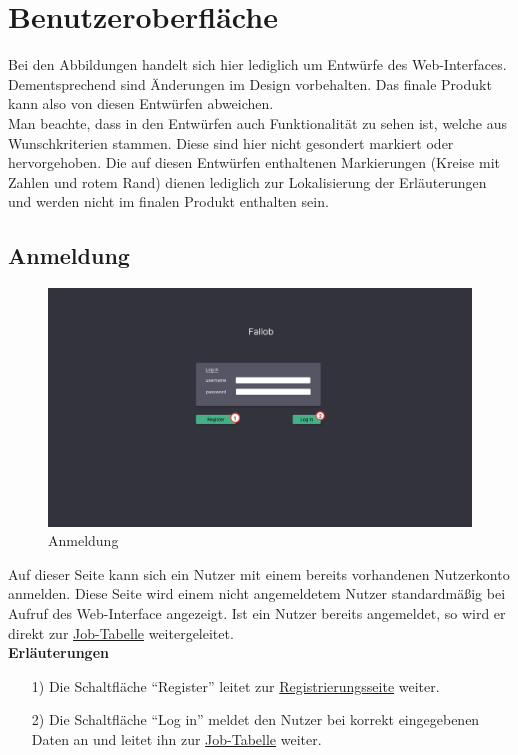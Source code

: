 \section{Benutzeroberfläche}

Bei den Abbildungen handelt sich hier lediglich um Entwürfe des \gls{Web-Interface}s. Dementsprechend sind Änderungen im Design vorbehalten. Das finale Produkt kann also von diesen Entwürfen abweichen.\\
Man beachte, dass in den Entwürfen auch Funktionalität zu sehen ist, welche aus Wunschkriterien stammen. Diese sind hier nicht gesondert markiert oder hervorgehoben. Die auf diesen Entwürfen enthaltenen Markierungen (Kreise mit Zahlen und rotem Rand) dienen lediglich zur Lokalisierung der Erläuterungen und werden nicht im finalen Produkt enthalten sein.
\subsection{Anmeldung}
\label{pages:login}
\begin{figure}[H]
    \centering
    \includegraphics[width=\textwidth]{images-interface/v4_interface/login_page_4.pdf}
    \caption{Anmeldung}
    \label{fig:login}
\end{figure}
Auf dieser Seite kann sich ein \gls{Nutzer} mit einem bereits vorhandenen \gls{Nutzerkonto} anmelden. Diese Seite wird einem nicht angemeldetem \gls{Nutzer} standardmäßig bei Aufruf des \gls{Web-Interface} angezeigt. Ist ein \gls{Nutzer} bereits angemeldet, so wird er direkt zur \hyperref[pages:job-table]{Job-Tabelle} weitergeleitet.\\
\newpage
\textbf{Erläuterungen}
\begin{itemize}
    \item[1)] Die Schaltfläche \enquote{Register} leitet zur \hyperref[pages:register]{Registrierungsseite} weiter.
    \item[2)] Die Schaltfläche \enquote{Log in} meldet den \gls{Nutzer} bei korrekt eingegebenen Daten an und leitet ihn zur \hyperref[pages:job-table]{Job-Tabelle} weiter.
\end{itemize}

